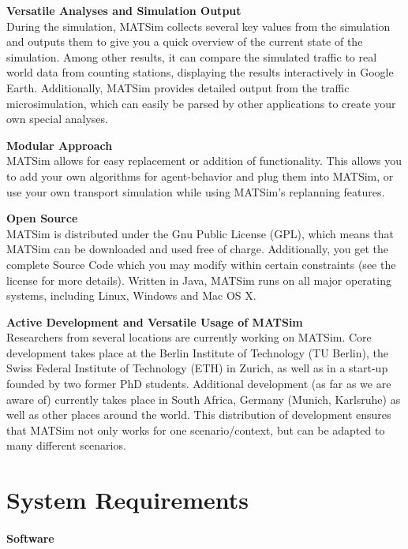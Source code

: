 \documentclass[a4paper,11pt]{report}
\begin{document}
\textbf{Versatile Analyses and Simulation Output}
\\  During the simulation, MATSim collects several key values from the  simulation and outputs them to give you a quick overview of the current  state of the simulation. Among other results, it can compare the  simulated traffic to real world data from counting stations, displaying  the results interactively in Google Earth. Additionally, MATSim provides  detailed output from the traffic microsimulation, which can easily be  parsed by other applications to create your own special analyses.

\textbf{Modular Approach
\\}MATSim  allows for easy replacement or addition of functionality. This allows  you to add your own algorithms for agent-behavior and plug them into  MATSim, or use your own transport simulation while using MATSim's  replanning features.

\textbf{Open Source}
\\ MATSim is  distributed under the Gnu Public License (GPL), which means that MATSim  can be downloaded and used free of charge. Additionally, you get the  complete Source Code which you may modify within certain constraints  (see the license for more details). Written in Java, MATSim runs on all  major operating systems, including Linux, Windows and Mac OS X.

\textbf{Active Development and Versatile Usage of MATSim}
\\  Researchers from several locations are currently working on MATSim.  Core development takes place at the Berlin Institute of Technology (TU  Berlin), the Swiss Federal Institute of Technology (ETH) in Zurich, as  well as in a start-up founded by two former PhD students. Additional  development (as far as we are aware of) currently takes place in South  Africa, Germany (Munich, Karlsruhe) as well as other places around the  world. This distribution of development ensures that MATSim not only  works for one scenario/context, but can be adapted to many different  scenarios.


\chapter{System Requirements}

\subsubsection{Software}
\end{document}
